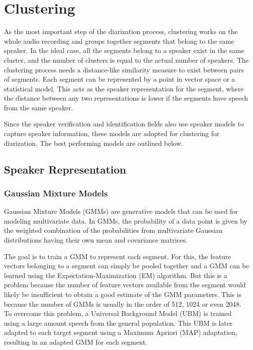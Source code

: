 \section{Clustering}
	As the most important step of the diarization process, clustering works on the whole audio recording and groups together segments that belong to the same speaker. In the ideal case, all the segments belong to a speaker exist in the same cluster, and the number of clusters is equal to the actual number of speakers. The clustering process needs a distance-like similarity measure to exist between pairs of segments. Each segment can be represented by a point in vector space or a statistical model. This acts as the speaker representation for the segment, where the distance between any two representations is lower if the segments have speech from the same speaker.
	
	Since the speaker verification and identification fields also use speaker models to capture speaker information, these models are adopted for clustering for diarization. The best performing models are outlined below.
	
	\subsection{Speaker Representation}
		\subsubsection{Gaussian Mixture Models}
		Gaussian Mixture Models (GMMs) are generative models that can be used for modeling multivariate data. In GMMs, the probability of a data point is given by the weighted combination of the probabilities from multivariate Gaussian distributions having their own mean and covariance matrices.
		
		The goal is to train a GMM to represent each segment. For this, the feature vectors belonging to a segment can simply be pooled together and a GMM can be learned using the Expectation-Maximization (EM) \cite{moon1996expectation} algorithm. But this is a problem because the number of feature vectors available from the segment would likely be insufficient to obtain a good estimate of the GMM parameters. This is because the number of GMMs is usually in the order of 512, 1024 or even 2048. To overcome this problem, a Universal Background Model (UBM) is trained using a large amount speech from the general population. This UBM is later adapted to each target segment using a Maximum Apriori (MAP) adaptation, resulting in an adapted GMM for each segment.
		
